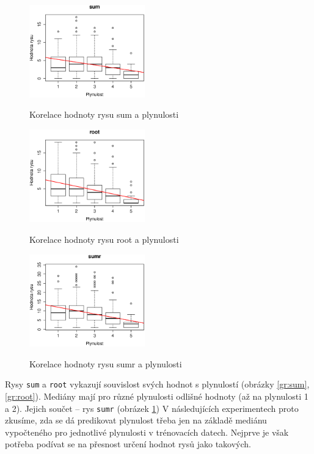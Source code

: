 \documentclass[12pt,a4paper]{report}
\begin{document}
\begin{figure}[!htb]
\begin{center}
  \centering\includegraphics[width=50mm]{./grafy/rysy/sum.eps}
  \caption{Korelace hodnoty rysu sum a plynulosti}\label{gr:sum}
\endminipage\quad
{}
  \centering\includegraphics[width=50mm]{./grafy/rysy/root.eps}
  \caption{Korelace hodnoty rysu root a plynulosti}\label{gr:root}
\endminipage\quad
{}
  \centering\includegraphics[width=50mm]{./grafy/rysy/sumr.eps}
  \caption{Korelace hodnoty rysu sumr a plynulosti}\label{gr:sumr}
\endminipage
\end{center}
\end{figure}

Rysy \texttt{sum} a \texttt{root} vykazují souvislost svých hodnot s plynulostí (obrázky \ref{gr:sum}, \ref{gr:root}). Mediány mají pro různé plynulosti odlišné hodnoty (až na plynulosti 1 a 2). Jejich součet -- rys \texttt{sumr} (obrázek \ref{gr:sumr})  V následujících experimentech proto zkusíme, zda se dá predikovat plynulost třeba jen na základě mediánu vypočteného pro jednotlivé plynulosti v trénovacích datech. Nejprve je však potřeba podívat se na přesnost určení hodnot rysů jako takových.
\end{document}
